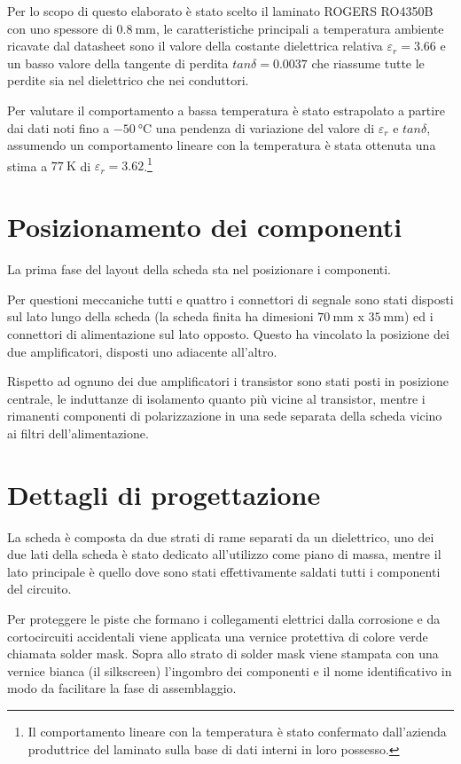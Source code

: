 \documentclass[12pt,oneside]{book}
\begin{document}
Per lo scopo di questo elaborato è stato scelto il laminato ROGERS RO4350B con uno spessore di $\SI{0.8}{\milli\meter}$, le caratteristiche principali a temperatura ambiente ricavate dal datasheet sono il valore della costante dielettrica relativa $\varepsilon_r=3.66$ e un basso valore della tangente di perdita $tan\delta=0.0037$ che riassume tutte le perdite sia nel dielettrico che nei conduttori.

Per valutare il comportamento a bassa temperatura è stato estrapolato a partire dai dati noti fino a $\SI{-50}{\degreeCelsius}$ una pendenza di variazione del valore di $\varepsilon_r$ e $tan\delta$, assumendo un comportamento lineare con la temperatura è stata ottenuta una stima a $\SI{77}{\kelvin}$ di $\varepsilon_r=3.62$.\footnote{Il comportamento lineare con la temperatura è stato confermato dall'azienda produttrice del laminato sulla base di dati interni in loro possesso.}



\section{Posizionamento dei componenti}
La prima fase del layout della scheda sta nel posizionare i componenti.

Per questioni meccaniche tutti e quattro i connettori di segnale sono stati disposti sul lato lungo della scheda (la scheda finita ha dimesioni $\SI{70}{\milli\meter}$ x $\SI{35}{\milli\meter}$) ed i connettori di alimentazione sul lato opposto. Questo ha vincolato la posizione dei due amplificatori, disposti uno adiacente all'altro.

Rispetto ad ognuno dei due amplificatori i transistor sono stati posti in posizione centrale, le induttanze di isolamento quanto più vicine al transistor, mentre i rimanenti componenti di polarizzazione in una sede separata della scheda vicino ai filtri dell'alimentazione.


\section{Dettagli di progettazione}
La scheda è composta da due strati di rame separati da un dielettrico, uno dei due lati della scheda è stato dedicato all'utilizzo come piano di massa, mentre il lato principale è quello dove sono stati effettivamente saldati tutti i componenti del circuito.

Per proteggere le piste che formano i collegamenti elettrici dalla corrosione e da cortocircuiti accidentali viene applicata una vernice protettiva di colore verde chiamata solder mask. Sopra allo strato di solder mask viene stampata con una vernice bianca (il silkscreen) l'ingombro dei componenti e il nome identificativo in modo da facilitare la fase di assemblaggio.
\end{document}

